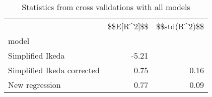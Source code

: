 
\begin{table}[H]
    \centering
    \caption{Statistics from cross validations with all models}
   \begin{tabular}{lrr}
\toprule
{} &  \$\$E[R\textasciicircum 2]\$\$ &  \$\$std(R\textasciicircum 2)\$\$ \\
model                      &             &               \\
\midrule
Simplified Ikeda           &       -5.21 &               \\
Simplified Ikeda corrected &        0.75 &          0.16 \\
New regression             &        0.77 &          0.09 \\
\bottomrule
\end{tabular}

    \label{tab:crossvalidation}
\end{table}
    